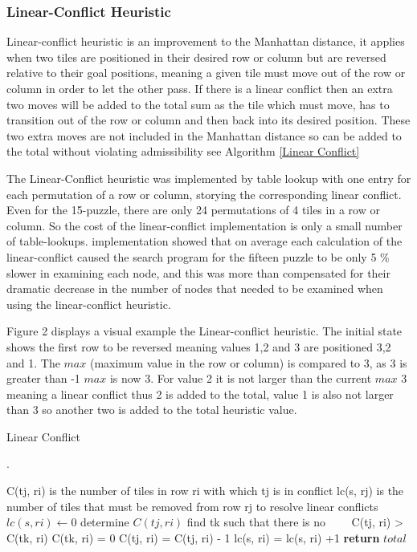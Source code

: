 \documentclass[final]{cmpreport}
\begin{document}
\subsubsection{Linear-Conflict Heuristic}
Linear-conflict heuristic is an improvement to the Manhattan distance, it applies when two tiles are positioned in their desired row or column but are reversed relative to
their goal positions, meaning a given tile must move out of the row or column in order to let the other pass. If there is a linear conflict then an extra two moves will be added to the total sum as the tile which must move, has to transition out of the row or column and then back into its desired position. These two extra moves are not included in the Manhattan distance so can be added to the total without violating admissibility see Algorithm \ref{Linear Conflict} 

The Linear-Conflict heuristic was implemented by table lookup with one entry for each permutation of a row or column, storying the corresponding linear conflict. Even for the 15-puzzle, there are only 24 permutations of 4 tiles in a row or column. So the cost of the linear-conflict implementation is only a small number of table-lookups. \cite{hansson1992criticizing} implementation showed that on average each calculation of the linear-conflict caused the search program for the fifteen puzzle to be only 5 \% slower in examining each node, and this was more than compensated for their dramatic decrease in the number of nodes that needed to be examined when using the linear-conflict heuristic.

Figure 2 displays a visual example the Linear-conflict heuristic. The initial state shows the first row to be reversed meaning values 1,2 and 3 are positioned 3,2 and 1. The $max$ (maximum value in the row or column) is compared to 3, as 3 is greater than -1 $max$ is now 3. For value 2 it is not larger than the current $max$ 3 meaning a linear conflict thus 2 is added to the total, value 1 is also not larger than 3 so another two is added to the total heuristic value.


\begin{algorithm}
	\caption{Linear Conflict}\label{Linear Conflict}\cite{hansson1992criticizing}.
	\begin{algorithmic}[1]
		\State C(tj, ri) is the number of tiles in row ri with which tj is in conflict
		\State lc(s, rj) is the number of tiles that must be removed from row rj to resolve linear conflicts
			
			\State $lc(s, ri)\gets 0$
				\State determine $C(tj, ri)$
					\State find tk such that there is no
					\State \ \ \ \  C(tj, ri) > C(tk, ri)
					\State C(tk, ri) = 0 
						\State C(tj, ri) = C(tj, ri) - 1 
					\EndFor
					\State lc(s, ri) = lc(s, ri) +1	
				\EndWhile
			\EndFor
		\EndFor
		\State \textbf{return} $total$
		\EndProcedure
	\end{algorithmic}
\end{algorithm}
\end{document}
